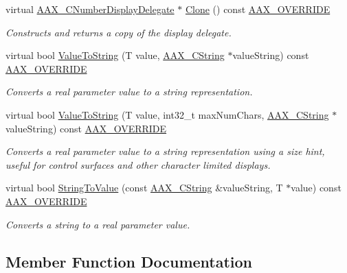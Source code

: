 \begin{DoxyCompactItemize}
\item 
virtual \hyperlink{a00028}{A\+A\+X\+\_\+\+C\+Number\+Display\+Delegate} $\ast$ \hyperlink{a00028_ab92a0973a7ed56034aa269c760d6b935}{Clone} () const \hyperlink{a00149_ac2f24a5172689ae684344abdcce55463}{A\+A\+X\+\_\+\+O\+V\+E\+R\+R\+I\+D\+E}
\begin{DoxyCompactList}\small\item\em Constructs and returns a copy of the display delegate. \end{DoxyCompactList}\item 
virtual bool \hyperlink{a00028_a260439b47a0890a008f7984958e11662}{Value\+To\+String} (T value, \hyperlink{a00042}{A\+A\+X\+\_\+\+C\+String} $\ast$value\+String) const \hyperlink{a00149_ac2f24a5172689ae684344abdcce55463}{A\+A\+X\+\_\+\+O\+V\+E\+R\+R\+I\+D\+E}
\begin{DoxyCompactList}\small\item\em Converts a real parameter value to a string representation. \end{DoxyCompactList}\item 
virtual bool \hyperlink{a00028_a8cb553887b6a334fbcb6432770c67ed8}{Value\+To\+String} (T value, int32\+\_\+t max\+Num\+Chars, \hyperlink{a00042}{A\+A\+X\+\_\+\+C\+String} $\ast$value\+String) const \hyperlink{a00149_ac2f24a5172689ae684344abdcce55463}{A\+A\+X\+\_\+\+O\+V\+E\+R\+R\+I\+D\+E}
\begin{DoxyCompactList}\small\item\em Converts a real parameter value to a string representation using a size hint, useful for control surfaces and other character limited displays. \end{DoxyCompactList}\item 
virtual bool \hyperlink{a00028_ad7fba7856368f7ffe4398e6efd65dfa5}{String\+To\+Value} (const \hyperlink{a00042}{A\+A\+X\+\_\+\+C\+String} \&value\+String, T $\ast$value) const \hyperlink{a00149_ac2f24a5172689ae684344abdcce55463}{A\+A\+X\+\_\+\+O\+V\+E\+R\+R\+I\+D\+E}
\begin{DoxyCompactList}\small\item\em Converts a string to a real parameter value. \end{DoxyCompactList}\end{DoxyCompactItemize}


\subsection{Member Function Documentation}
\hypertarget{a00028_ab92a0973a7ed56034aa269c760d6b935}{}
